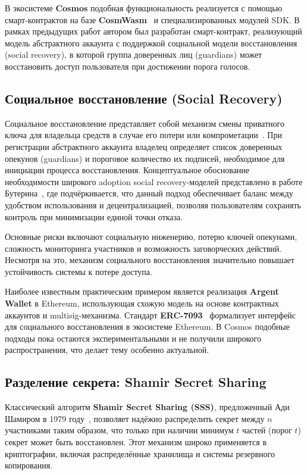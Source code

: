 \documentclass[12pt]{a&t}
\begin{document}
В экосистеме \textbf{Cosmos} подобная функциональность реализуется с помощью смарт-контрактов на базе \textbf{CosmWasm}~\cite{cosmwasm} и специализированных модулей SDK. В рамках предыдущих работ автором был разработан смарт-контракт, реализующий модель абстрактного аккаунта с поддержкой социальной модели восстановления (social recovery), в которой группа доверенных лиц (guardians) может восстановить доступ пользователя при достижении порога голосов.

\subsection{Социальное восстановление (Social Recovery)}

Социальное восстановление представляет собой механизм смены приватного ключа для владельца средств в случае его потери или компрометации~\cite{erc7093,aa_mass_adoption}. При регистрации абстрактного аккаунта владелец определяет список доверенных опекунов (guardians) и пороговое количество их подписей, необходимое для инициации процесса восстановления. Концептуальное обоснование необходимости широкого adoption social recovery-моделей представлено в работе Бутерина~\cite{buterin2021}, где подчёркивается, что данный подход обеспечивает баланс между удобством использования и децентрализацией, позволяя пользователям сохранять контроль при минимизации единой точки отказа.

Основные риски включают социальную инженерию, потерю ключей опекунами, сложность мониторинга участников и возможность заговорческих действий. Несмотря на это, механизм социального восстановления значительно повышает устойчивость системы к потере доступа.

Наиболее известным практическим примером является реализация \textbf{Argent Wallet} в Ethereum, использующая схожую модель на основе контрактных аккаунтов и multisig-механизма. Стандарт \textbf{ERC-7093}~\cite{erc7093} формализует интерфейс для социального восстановления в экосистеме Ethereum. В Cosmos подобные подходы пока остаются экспериментальными и не получили широкого распространения, что делает тему особенно актуальной.

\subsection{Разделение секрета: Shamir Secret Sharing}

Классический алгоритм \textbf{Shamir Secret Sharing (SSS)}, предложенный Ади Шамиром в 1979 году~\cite{shamirss}, позволяет надёжно распределить секрет между $n$ участниками таким образом, что только при наличии минимум $t$ частей (порог $t$) секрет может быть восстановлен. Этот механизм широко применяется в криптографии, включая распределённые хранилища и системы резервного копирования.
\end{document}
